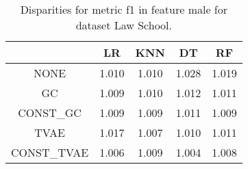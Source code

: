\begin{table}
\caption{Disparities for metric f1 in feature male for dataset Law School.}
\label{tab:disp-LAW SCHOOL-male-f1}
\begin{tabular}{ccccc}
\toprule
 & LR & KNN & DT & RF \\
\midrule
NONE & 1.010 & 1.010 & 1.028 & 1.019 \\
GC & 1.009 & 1.010 & 1.012 & 1.011 \\
CONST\_GC & 1.009 & 1.009 & 1.011 & 1.009 \\
TVAE & 1.017 & 1.007 & 1.010 & 1.011 \\
CONST\_TVAE & 1.006 & 1.009 & 1.004 & 1.008 \\
\bottomrule
\end{tabular}
\end{table}
